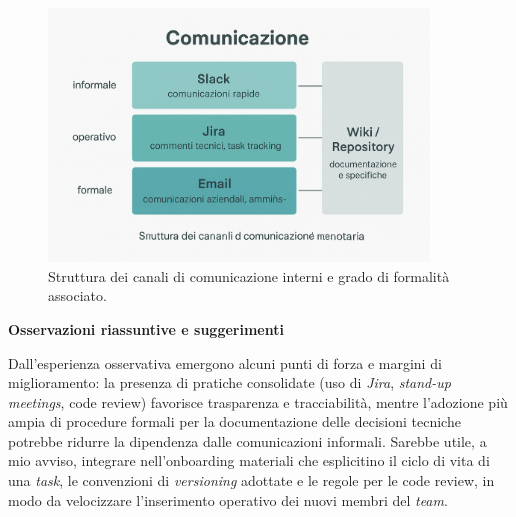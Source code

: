 \begin{figure}[htbp]
    \centering
    \includegraphics[width=0.9\textwidth]{images/azienda/comunicazione}
    \caption{Struttura dei canali di comunicazione interni e grado di formalità associato.}
    \label{fig:comunicazione}
\end{figure}



\medskip
\noindent\textbf{Osservazioni riassuntive e suggerimenti}

Dall’esperienza osservativa emergono alcuni punti di forza e margini di miglioramento: la presenza di pratiche consolidate (uso di \emph{Jira}, \emph{stand-up meetings}, code review) 
favorisce trasparenza e tracciabilità, mentre l’adozione più ampia di procedure formali per la documentazione delle decisioni tecniche potrebbe ridurre la dipendenza dalle comunicazioni informali. 
Sarebbe utile, a mio avviso, integrare nell’onboarding materiali che esplicitino il ciclo di vita di una \emph{task}, le convenzioni di \emph{versioning} adottate e le regole per le code review, 
in modo da velocizzare l’inserimento operativo dei nuovi membri del \emph{team}.

